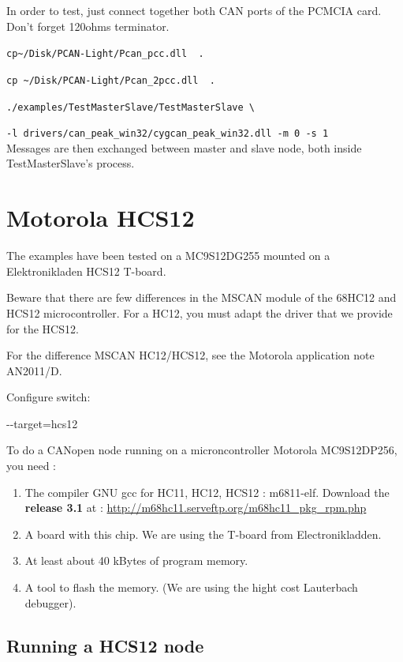 \documentclass[a4paper,12pt]{book}
\newcommand\liststyleLx{%
\renewcommand\labelitemi{{--}}
\renewcommand\labelitemii{{--}}
\renewcommand\labelitemiii{{--}}
\renewcommand\labelitemiv{{--}}
}
\newcommand{\canopen}{CANopen}
\begin{document}
In order to test, just connect together both CAN ports of the PCMCIA
card. Don't forget 120ohms terminator.

\texttt{cp\~{ }/Disk/PCAN-Light/Pcan\_pcc.dll ~.}

\texttt{cp \~{ }/Disk/PCAN-Light/Pcan\_2pcc.dll ~.}

\texttt{./examples/TestMasterSlave/TestMasterSlave \textbackslash{}}

\texttt{-l drivers/can\_peak\_win32/cygcan\_peak\_win32.dll -m 0 -s
1}~\\


Messages are then exchanged between master and slave node, both inside
TestMasterSlave's process.

\section{Motorola HCS12}
The examples have been tested on a MC9S12DG255 mounted on a
Elektronikladen HCS12 T{}-board.

Beware that there are few differences in the MSCAN module of the
68HC12 and HCS12 microcontroller. For a HC12, you must adapt the driver
that we provide for \space the HCS12.

For the difference MSCAN HC12/HCS12, see the Motorola application note
AN2011/D.

Configure switch:

{\ttfamily
 {}-{}-target=hcs12}

To do a \canopen{} node running on a microncontroller Motorola MC9S12DP256,
you need :

\liststyleLx
\begin{enumerate}
\item The compiler GNU gcc for HC11, HC12, HCS12 : m6811{}-elf. \newline
Download the \textbf{release 3.1} at :
\space \href{http://m68hc11.serveftp.org/m68hc11_pkg_rpm.php}{http://m68hc11.serveftp.org/m68hc11\_pkg\_rpm.php}

\item A board with this chip. We are using the T{}-board from
Electronikladden. 
\item At least about 40 kBytes of program memory.
\item A tool to flash the memory. (We are using the hight cost
Lauterbach debugger).
\end{enumerate}
\subsection{Running a HCS12 node}
\end{document}
